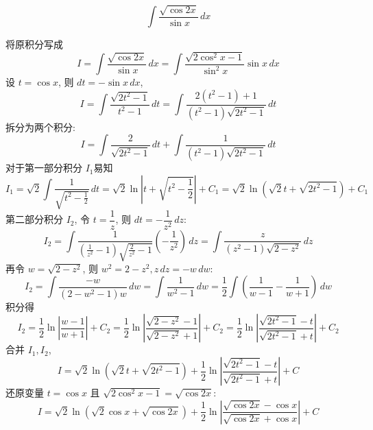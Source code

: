 \begin{questions}
    \question
    \[
    \int \frac{\sqrt{\cos 2x}}{\sin x} \,dx
    \]
    \begin{solution}
        将原积分写成
        \[
        I = \int \frac{\sqrt{\cos 2x}}{\sin x} \,dx = \int \frac{\sqrt{2\cos^2 x - 1}}{\sin^2 x} \sin x \,dx
        \]
        设 $t = \cos x$, 则 $dt = -\sin x \,dx$,
        \[
        I = \int \frac{\sqrt{2t^2 - 1}}{t^2 - 1} \,dt = \int \frac{2(t^2-1) + 1}{(t^2-1)\sqrt{2t^2-1}} \,dt
        \]
        拆分为两个积分:
        \[
        I = \int \frac{2}{\sqrt{2t^2 - 1}} \,dt + \int \frac{1}{(t^2 - 1)\sqrt{2t^2 - 1}} \,dt
        \]
        对于第一部分积分 $I_1$易知
        \[
        I_1 = \sqrt{2} \int \frac{1}{\sqrt{t^2 - \frac{1}{2}}} \,dt = \sqrt{2} \ln \left| t + \sqrt{t^2 - \frac{1}{2}} \right| + C_1 = \sqrt{2} \ln(\sqrt{2}t + \sqrt{2t^2 - 1}) + C_1
        \]
        第二部分积分 $I_2$, 令 $t = \dfrac{1}{z}$, 则 $dt = -\dfrac{1}{z^2} \,dz$:
        \[
        I_2 = \int \frac{1}{(\frac{1}{z^2} - 1)\sqrt{\frac{2}{z^2} - 1}} \left( -\frac{1}{z^2} \right) \,dz = \int \frac{z}{(z^2 - 1)\sqrt{2 - z^2}} \,dz
        \]
        再令 $w = \sqrt{2 - z^2}$, 则 $w^2 = 2 - z^2,z \,dz = -w \,dw$:
        \[
        I_2 = \int \frac{-w}{(2 - w^2 - 1)w} \,dw = \int \frac{1}{w^2 - 1} \,dw = \frac{1}{2} \int \left(\frac{1}{w-1}-\frac{1}{w+1}\right) \,dw
        \]
        积分得
        \[
        I_2 = \frac{1}{2} \ln \left| \frac{w - 1}{w + 1} \right| + C_2 = \frac{1}{2} \ln \left| \frac{\sqrt{2 - z^2} - 1}{\sqrt{2 - z^2} + 1} \right| + C_2 = \frac{1}{2} \ln \left| \frac{\sqrt{2t^2 - 1} - t}{\sqrt{2t^2 - 1} + t} \right| + C_2
        \]
        合并 $I_1,I_2$,
        \[
        I = \sqrt{2} \ln(\sqrt{2}t + \sqrt{2t^2 - 1}) + \frac{1}{2} \ln \left| \frac{\sqrt{2t^2 - 1} - t}{\sqrt{2t^2 - 1} + t} \right| + C
        \]
        还原变量 $t = \cos x$ 且 $\sqrt{2\cos^2 x - 1} = \sqrt{\cos 2x}$:
        \[
        I = \sqrt{2} \ln(\sqrt{2}\cos x + \sqrt{\cos 2x}) + \frac{1}{2} \ln \left| \frac{\sqrt{\cos 2x} - \cos x}{\sqrt{\cos 2x} + \cos x} \right| + C
        \]
    \end{solution}


\end{questions}

